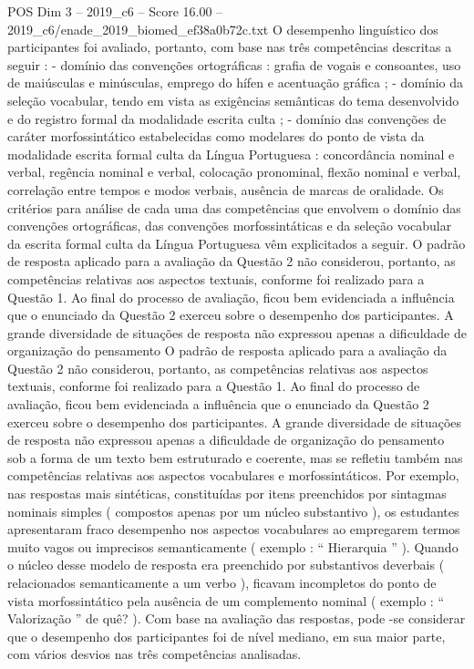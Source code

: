 \begin{textsample}{POS Dim 3 – 2019\_c6 – Score 16.00 – 2019\_c6/enade\_2019\_biomed\_ef38a0b72c.txt}
O desempenho linguístico dos participantes foi avaliado, portanto, com base nas três competências descritas a seguir : - domínio das convenções ortográficas : grafia de vogais e consoantes, uso de maiúsculas e minúsculas, emprego do hífen e acentuação gráfica ; - domínio da seleção vocabular, tendo em vista as exigências semânticas do tema desenvolvido e do registro formal da modalidade escrita culta ; - domínio das convenções de caráter morfossintático estabelecidas como modelares do ponto de vista da modalidade escrita formal culta da Língua Portuguesa : concordância nominal e verbal, regência nominal e verbal, colocação pronominal, flexão nominal e verbal, correlação entre tempos e modos verbais, ausência de marcas de oralidade.
Os critérios para análise de cada uma das competências que envolvem o domínio das convenções ortográficas, das convenções morfossintáticas e da seleção vocabular da escrita formal culta da Língua Portuguesa vêm explicitados a seguir.
O padrão de resposta aplicado para a avaliação da Questão 2 não considerou, portanto, as competências relativas aos aspectos textuais, conforme foi realizado para a Questão 1.
Ao final do processo de avaliação, ficou bem evidenciada a influência que o enunciado da Questão 2 exerceu sobre o desempenho dos participantes.
A grande diversidade de situações de resposta não expressou apenas a dificuldade de organização do pensamento O padrão de resposta aplicado para a avaliação da Questão 2 não considerou, portanto, as competências relativas aos aspectos textuais, conforme foi realizado para a Questão 1.
Ao final do processo de avaliação, ficou bem evidenciada a influência que o enunciado da Questão 2 exerceu sobre o desempenho dos participantes.
A grande diversidade de situações de resposta não expressou apenas a dificuldade de organização do pensamento sob a forma de um texto bem estruturado e coerente, mas se refletiu também nas competências relativas aos aspectos vocabulares e morfossintáticos.
Por exemplo, nas respostas mais sintéticas, constituídas por itens preenchidos por sintagmas nominais simples ( compostos apenas por um núcleo substantivo ), os estudantes apresentaram fraco desempenho nos aspectos vocabulares ao empregarem termos muito vagos ou imprecisos semanticamente ( exemplo : “ Hierarquia ” ).
Quando o núcleo desse modelo de resposta era preenchido por substantivos deverbais ( relacionados semanticamente a um verbo ), ficavam incompletos do ponto de vista morfossintático pela ausência de um complemento nominal ( exemplo : “ Valorização ” de quê? ).
Com base na avaliação das respostas, pode -se considerar que o desempenho dos participantes foi de nível mediano, em sua maior parte, com vários desvios nas três competências analisadas.

\end{textsample}
